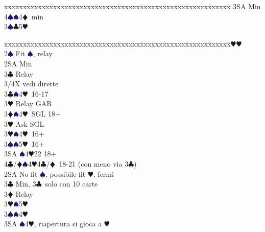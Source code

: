 \documentclass[a4paper,italian]{article}
\newcommand{\BC}{\textcolor{OliveGreen}{$\clubsuit$}}
\newcommand{\BD}{\textcolor{RedOrange}{$\vardiamondsuit$}}
\newcommand{\BH}{\textcolor{Red2}{$\varheartsuit${}}}
\newcommand{\BS}{\textcolor{MidnightBlue}{$\spadesuit${}}}
\newenvironment{bidtable}
{\begin{tabbing}

    xxxxxx\=xxxxxx\=xxxxxx\=xxxxxx\=xxxxxx\=xxxxxx\=xxxxxx\=xxxxxx\=xxxxxx\=xxxxxx\=\kill}
{\end{tabbing} }%
\begin{document}
\begin{multicols}{2}
\begin{bidtable}
                                            3SA \> Min\\
                                            4\BS {}\BS 4\BD\ min\-\\
                                            3\BS {}\BC 5\BH \-\\
                                        \end{bidtable}
                                        \columnbreak
                                        \begin{bidtable}
                                            2\BH {}\BH \+\\
                                            2\BS \> Fit \BS , relay\+\\
                                            2SA \> Min\+\\
                                            3\BC \> Relay\+\\
                                            3/4X \> vedi dirette\-\-\\
                                            3\BC {}\BS 4\BH\ 16-17\+\\
                                            3\BH \> Relay GAR\-\\
                                            3\BD {}\BS 4\BH\ SGL 18+\+\\
                                            3\BH \> Ask SGL\-\\
                                            3\BH {}\BS 4\BH\ 16+\\
                                            3\BS {}\BS 5\BH\ 16+\\
                                            3SA \BS 4\BH 22 18+\\
                                            4\BC/\BD {}\BS 4\BH 4\BC/\BD\ 18-21 (con meno via 3\BC )\-\\
                                            2SA \> No fit \BS , possibile fit \BH , fermi\+\\
                                            3\BC \> Min, 3\BC\ solo con 10 carte\+\\
                                            3\BD \> Relay\+\\
                                            3\BH {}\BS 5\BH \\
                                            3\BS {}\BS 4\BH \\
                                            3SA \BS 4\BH , riapertura si gioca a \BH \\

\end{bidtable}
\end{multicols}
\end{document}

